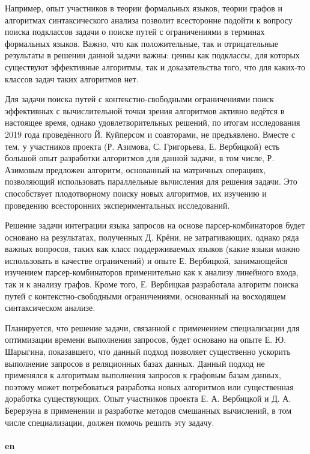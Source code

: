 \documentclass[12pt]{article}  %
\theoremstyle{remark}
\begin{document}
Например, опыт участников в теории формальных языков, теории графов и алгоритмах синтаксического анализа позволит всесторонне подойти к вопросу поиска подклассов задачи о поиске путей с ограничениями в терминах формальных языков. Важно, что как положительные, так и отрицательные результаты в решении данной задачи важны: ценны как подклассы, для которых существуют эффективные алгоритмы, так и доказательства того, что для каких-то классов задач таких алгоритмов нет.

Для задачи поиска путей с контекстно-свободными ограничениями поиск эффективных с вычислительной точки зрения алгоритмов активно ведётся в настоящее время, однако удовлетворительных решений, по итогам исследования 2019 года проведённого Й. Куйперсом и соавторами, не предъявлено. Вместе с тем, у участников проекта (Р. Азимова, С. Григорьева, Е. Вербицкой) есть большой опыт разработки алгоритмов для данной задачи, в том числе, Р. Азимовым предложен алгоритм, основанный на матричных операциях, позволяющий использовать параллельные вычисления для решения задачи. Это способствует плодотворному поиску новых алгоритмов, их изучению и проведению всесторонних экспериментальных исследований.

Решение задачи интеграции языка запросов на основе парсер-комбинаторов будет основано на результатах, полученных Д. Крёни, не затрагивающих, однако ряда важных вопросов, таких как класс поддерживаемых языков (какие языки можно использовать в качестве ограничений) и опыте Е. Вербицкой, занимающейся изучением парсер-комбинаторов применительно как к анализу линейного входа, так и к анализу графов. Кроме того, Е. Вербицкая разработала алгоритм поиска путей с контекстно-свободными ограничениями, основанный на восходящем синтаксическом анализе.

Планируется, что решение задачи, связанной с применением специализации для оптимизации времени выполнения запросов, будет основано на опыте Е. Ю. Шарыгина, показавшего, что данный подход позволяет существенно ускорить выполнение запросов в реляционных базах данных. Данный подход не применялся к алгоритмам выполнения запросов к графовым базам данных, поэтому может потребоваться разработка новых алгоритмов или существенная доработка существующих. Опыт участников проекта Е. А. Вербицкой и Д. А. Берерзуна в применении и разработке методов смешанных вычислений, в том числе специализации, должен помочь решить эту задачу.
\\
\\
\textbf{en}\\
\end{document}
